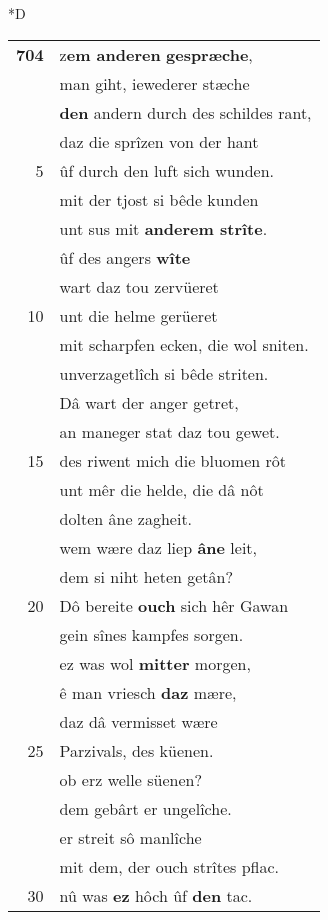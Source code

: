 \documentclass[8pt,a4paper,notitlepage]{article}
\begin{document}
\begin{table}[ht]
\begin{minipage}[t]{0.5\linewidth}
\small
\begin{center}*D
\end{center}
\begin{tabular}{rl}
\textbf{704} & z\textbf{em anderen} \textbf{gespræche},\\ 
 & man giht, iewederer stæche\\ 
 & \textbf{den} andern durch des schildes rant,\\ 
 & daz die sprîzen von der hant\\ 
5 & ûf durch den luft sich wunden.\\ 
 & mit der tjost si bêde kunden\\ 
 & unt sus mit \textbf{anderem strîte}.\\ 
 & ûf des angers \textbf{wîte}\\ 
 & wart daz tou zervüeret\\ 
10 & unt die helme gerüeret\\ 
 & mit scharpfen ecken, die wol sniten.\\ 
 & unverzagetlîch si bêde striten.\\ 
 & Dâ wart der anger getret,\\ 
 & an maneger stat daz tou gewet.\\ 
15 & des riwent mich die bluomen rôt\\ 
 & unt mêr die helde, die dâ nôt\\ 
 & dolten âne zagheit.\\ 
 & wem wære daz liep \textbf{âne} leit,\\ 
 & dem si niht heten getân?\\ 
20 & Dô bereite \textbf{ouch} sich hêr Gawan\\ 
 & gein sînes kampfes sorgen.\\ 
 & ez was wol \textbf{mitter} morgen,\\ 
 & ê man vriesch \textbf{daz} mære,\\ 
 & daz dâ vermisset wære\\ 
25 & Parzivals, des küenen.\\ 
 & ob erz welle süenen?\\ 
 & dem gebârt er ungelîche.\\ 
 & er streit sô manlîche\\ 
 & mit dem, der ouch strîtes pflac.\\ 
30 & nû was \textbf{ez} hôch ûf \textbf{den} tac.\\ 

\end{tabular}
\end{minipage}
\end{table}
\end{document}
